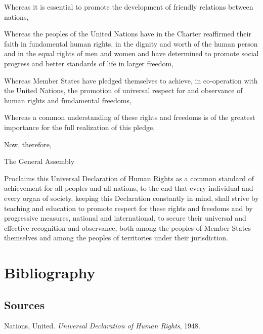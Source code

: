 \documentclass[
  titlepage,
  openright,
  DIV=calc,
  toc=listof,
  listof=nochaptergap]{scrbook}
\newlength{\cslhangindent}
\newlength{\cslentryspacingunit} %
\newenvironment{CSLReferences}[2] %
 {%
  \setlength{\parindent}{0pt}
  \ifodd #1
  \let\oldpar\par
  \def\par{\hangindent=\cslhangindent\oldpar}
  \fi
  \setlength{\parskip}{#2\cslentryspacingunit}
 }%
 {}
\begin{document}
Whereas it is essential to promote the development of friendly relations
between nations,

Whereas the peoples of the United Nations have in the Charter reaffirmed
their faith in fundamental human rights, in the dignity and worth of the
human person and in the equal rights of men and women and have
determined to promote social progress and better standards of life in
larger freedom,

Whereas Member States have pledged themselves to achieve, in
co-operation with the United Nations, the promotion of universal respect
for and observance of human rights and fundamental freedoms,

Whereas a common understanding of these rights and freedoms is of the
greatest importance for the full realization of this pledge,

Now, therefore,

The General Assembly

Proclaims this Universal Declaration of Human Rights as a common
standard of achievement for all peoples and all nations, to the end that
every individual and every organ of society, keeping this Declaration
constantly in mind, shall strive by teaching and education to promote
respect for these rights and freedoms and by progressive measures,
national and international, to secure their universal and effective
recognition and observance, both among the peoples of Member States
themselves and among the peoples of territories under their
jurisdiction.


\listoffigures

\hypertarget{bibliography}{%
\chapter{Bibliography}\label{bibliography}}

\hypertarget{sources}{%
\section{Sources}\label{sources}}

\hypertarget{refs_sources}{}
\begin{CSLReferences}{1}{0}
\leavevmode{}%
Nations, United. \emph{Universal {Declaration} of {Human} {Rights}},
1948.

\end{CSLReferences}
\end{document}
